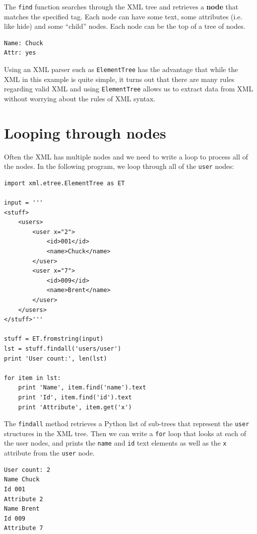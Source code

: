\documentclass[10pt]{book}
\begin{document}
The {\tt find} function searches through the 
XML tree and retrieves a {\bf node} that matches the specified tag.
Each node can have some text, some attributes (i.e. like hide) and
some ``child'' nodes.   Each node can be the top of a tree of nodes.

\beforeverb
\begin{verbatim}
Name: Chuck
Attr: yes
\end{verbatim}
\afterverb
%
Using an XML parser such as {\tt ElementTree} has the advantage
that while the XML in this example is quite simple, it turns
out that there are many rules regarding valid XML and using 
{\tt ElementTree} allows us to extract data from XML without 
worrying about the rules of XML syntax.

\section{Looping through nodes}

Often the XML has multiple nodes and we need to write a loop
to process all of the nodes.  In the following program, 
we loop through all of the {\tt user} nodes:

\beforeverb
\begin{verbatim}
import xml.etree.ElementTree as ET

input = '''
<stuff>
    <users>
        <user x="2">
            <id>001</id>
            <name>Chuck</name>
        </user>
        <user x="7">
            <id>009</id>
            <name>Brent</name>
        </user>
    </users>
</stuff>'''

stuff = ET.fromstring(input)
lst = stuff.findall('users/user')
print 'User count:', len(lst)

for item in lst:
    print 'Name', item.find('name').text
    print 'Id', item.find('id').text
    print 'Attribute', item.get('x')
\end{verbatim}
\afterverb
%
The {\tt findall} method retrieves a Python list of sub-trees that
represent the {\tt user} structures in the XML tree.  Then we can 
write a {\tt for} loop that looks at each of the user nodes, and 
prints the {\tt name} and {\tt id} text elements as well as the 
{\tt x} attribute from the {\tt user} node.

\beforeverb
\begin{verbatim}
User count: 2
Name Chuck
Id 001
Attribute 2
Name Brent
Id 009
Attribute 7
\end{verbatim}
\afterverb
%
\end{document}
